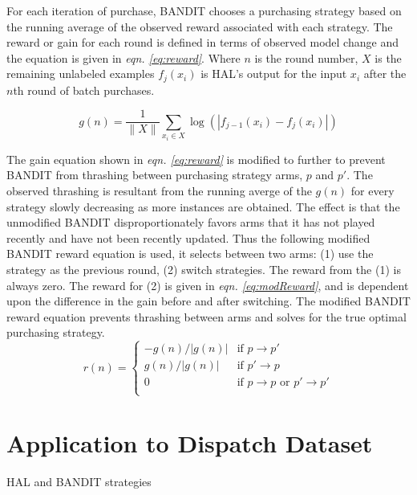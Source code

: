 \documentclass[ms]{nuthesis}
\begin{document}
For each iteration of purchase, BANDIT chooses a purchasing strategy
based on the running average of the observed reward associated with
each strategy. The reward or gain for each round is defined in terms of
observed model change and the equation is given in
\textit{eqn. \ref{eq:reward}}. Where $n$ is the round number,
$X$ is the remaining unlabeled examples $f_{j}(x_i)$ is HAL's output for the
input $x_i$ after the $n$th round of batch purchases.

\begin{equation}
\label{eq:reward}
g(n) = \frac{1}{\|X\|}\sum_{x_i \in X} \log{(|f_{j-1}(x_i) - f_{j}(x_i)|)}
\end{equation}

The gain equation shown in \textit{eqn. \ref{eq:reward}} is modified to further
to prevent BANDIT from thrashing between purchasing strategy arms, $p$ and $p'$.
The observed thrashing is resultant from the running averge of the $g(n)$
for every strategy slowly decreasing as more instances are obtained. The effect is
 that the unmodified BANDIT disproportionately favors arms that it has not played
  recently and have not been recently updated.
  Thus the following modified
  BANDIT reward equation is used, it selects between two arms: (1) use the
  strategy as the previous round, (2) switch strategies. The reward from the
  (1) is always zero. The reward for (2) is given in
  \textit{eqn. \ref{eq:modReward}}, and is dependent upon the difference
  in the gain before and after switching.
  The modified BANDIT reward
  equation prevents thrashing between arms and solves for the true optimal
  purchasing strategy.
\begin{equation}
\label{eq:modReward}
    r(n)=
\begin{cases}
   -g(n)/|g(n)| & \text{if } p \rightarrow p'\\
    g(n)/|g(n)| & \text{if } p' \rightarrow p\\
    0 & \text{if }  p \rightarrow  p \text{ or }  p' \rightarrow p' \\
\end{cases}
\end{equation}


\section{Application to Dispatch Dataset}
\par HAL and BANDIT strategies
\end{document}
